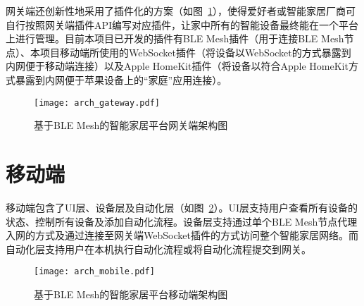 网关端还创新性地采用了插件化的方案（如图~\ref{fig:arch_gateway}），使得爱好者或智能家居厂商可自行按照网关端插件API编写对应插件，让家中所有的智能设备最终能在一个平台上进行管理。目前本项目已开发的插件有BLE Mesh插件（用于连接BLE Mesh节点）、本项目移动端所使用的WebSocket插件（将设备以WebSocket的方式暴露到内网便于移动端连接）以及Apple HomeKit插件（将设备以符合Apple HomeKit方式暴露到内网便于苹果设备上的“家庭”应用连接）。
\begin{figure}[H]
    \centering
    \texttt{[image: arch\_gateway.pdf]}
    \caption{基于BLE Mesh的智能家居平台网关端架构图}
    \label{fig:arch_gateway}
\end{figure}

\section{移动端}
\label{design:mobile}
移动端包含了UI层、设备层及自动化层（如图~\ref{fig:arch_mobile}）。UI层支持用户查看所有设备的状态、控制所有设备及添加自动化流程。设备层支持通过单个BLE Mesh节点代理入网的方式及通过连接至网关端WebSocket插件的方式访问整个智能家居网络。而自动化层支持用户在本机执行自动化流程或将自动化流程提交到网关。
\begin{figure}[H]
    \centering
    \texttt{[image: arch\_mobile.pdf]}
    \caption{基于BLE Mesh的智能家居平台移动端架构图}
    \label{fig:arch_mobile}
\end{figure}

